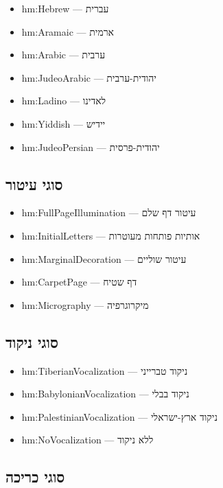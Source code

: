 \begin{itemize}
\item hm:Hebrew — עברית
\item hm:Aramaic — ארמית
\item hm:Arabic — ערבית
\item hm:JudeoArabic — יהודית-ערבית
\item hm:Ladino — לאדינו
\item hm:Yiddish — יידיש
\item hm:JudeoPersian — יהודית-פרסית
\end{itemize}

\subsection{סוגי עיטור}

\begin{itemize}
\item hm:FullPageIllumination — עיטור דף שלם
\item hm:InitialLetters — אותיות פותחות מעוטרות
\item hm:MarginalDecoration — עיטור שוליים
\item hm:CarpetPage — דף שטיח
\item hm:Micrography — מיקרוגרפיה
\end{itemize}

\subsection{סוגי ניקוד}

\begin{itemize}
\item hm:TiberianVocalization — ניקוד טברייני
\item hm:BabylonianVocalization — ניקוד בבלי
\item hm:PalestinianVocalization — ניקוד ארץ-ישראלי
\item hm:NoVocalization — ללא ניקוד
\end{itemize}

\subsection{סוגי כריכה}

